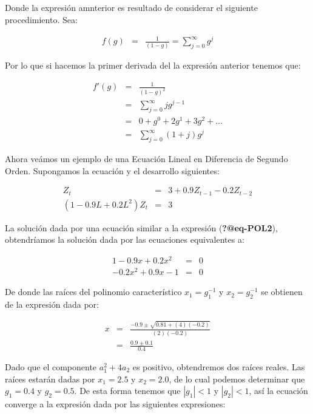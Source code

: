 \documentclass[
  a4paper,
]{article}
\begin{document}
Donde la expresión amnterior es resultado de considerar el siguiente
procedimiento. Sea:

\begin{eqnarray}
    f(g) & = & \frac{1}{(1 - g)} = \sum_{j = 0}^{\infty} g^j \nonumber
\end{eqnarray}

Por lo que si hacemos la primer derivada del la expresión anterior
tenemos que:

\begin{eqnarray}
    f'(g) & = & \frac{1}{(1 - g)^2} \nonumber \\
    & = & \sum_{j = 0}^{\infty} j g^{j-1} \nonumber \\
    & = & 0 + g^0 + 2 g^1 + 3 g^2 + \ldots \nonumber \\
    & = & \sum_{j = 0}^{\infty} (1 + j) g^j \nonumber
\end{eqnarray}

Ahora veámos un ejemplo de una Ecuación Lineal en Diferencia de Segundo
Orden. Supongamos la ecuación y el desarrollo siguientes:

\begin{eqnarray}
    Z_t & = & 3 + 0.9 Z_{t-1} - 0.2 Z_{t-2} \nonumber \\
    (1 - 0.9 L + 0.2 L^2) Z_t & = & 3 \nonumber
\end{eqnarray}

La solución dada por una ecuación similar a la expresión
(\textbf{?@eq-POL2}), obtendríamos la solución dada por las ecuaciones
equivalentes a:

\begin{eqnarray}
    1 - 0.9 x + 0.2 x^2 & = & 0 \nonumber \\
    - 0.2 x^2 + 0.9 x - 1 & = & 0 \nonumber
\end{eqnarray}

De donde las raíces del polinomio característico \(x_1 = g_1^{-1}\) y
\(x_2 = g_2^{-1}\) se obtienen de la expresión dada por:

\begin{eqnarray}
    x & = &\frac{-0.9 \pm \sqrt{0.81 + (4)(-0.2)}}{(2)(-0.2)} \nonumber \\
    & = & \frac{0.9 \pm 0.1}{0.4} \nonumber
\end{eqnarray}

Dado que el componente \(a^2_1 + 4 a_2\) es positivo, obtendremos dos
raíces reales. Las raíces estarán dadas por \(x_1 = 2.5\) y
\(x_2 = 2.0\), de lo cual podemos determinar que \(g_1 = 0.4\) y
\(g_2 = 0.5\). De esta forma tenemos que \(|g_1| < 1\) y \(|g_2| < 1\),
así la ecuación converge a la expresión dada por las siguientes
expresiones:
\end{document}
